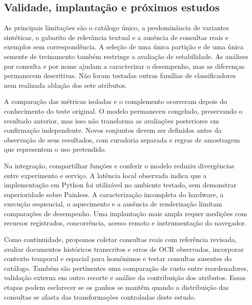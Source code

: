 \subsection{Validade, implantação e próximos estudos}

As principais limitações são o catálogo único, a predominância de variantes sintéticas, o gabarito de relevância textual e a ausência de consultas reais e exemplos sem correspondência. A seleção de uma única partição e de uma única semente de treinamento também restringe a avaliação de estabilidade. As análises por consulta e por nome ajudam a caracterizar o desempenho, mas as diferenças permanecem descritivas. Não foram testadas outras famílias de classificadores nem realizada ablação dos sete atributos.

A comparação das métricas isoladas e o complemento ocorreram depois do conhecimento do teste original. O modelo permaneceu congelado, preservando o resultado anterior, mas isso não transforma as avaliações posteriores em confirmação independente. Novos conjuntos devem ser definidos antes da observação de seus resultados, com curadoria separada e regras de amostragem que representem o uso pretendido.

Na integração, compartilhar funções e conferir o modelo reduziu divergências entre experimento e serviço. A latência local observada indica que a implementação em Python foi utilizável no ambiente testado, sem demonstrar superioridade sobre Painless. A caracterização incompleta do hardware, a execução sequencial, o aquecimento e a ausência de renderização limitam comparações de desempenho. Uma implantação mais ampla requer medições com recursos registrados, concorrência, acesso remoto e instrumentação do navegador.

Como continuidade, propomos coletar consultas reais com referência revisada, avaliar documentos históricos transcritos e erros de OCR observados, incorporar contexto temporal e espacial para homônimos e testar consultas ausentes do catálogo. Também são pertinentes uma comparação de custo entre reordenadores, validação externa em outro recorte e análise da contribuição dos atributos. Essas etapas podem esclarecer se os ganhos se mantêm quando a distribuição das consultas se afasta das transformações controladas deste estudo.
